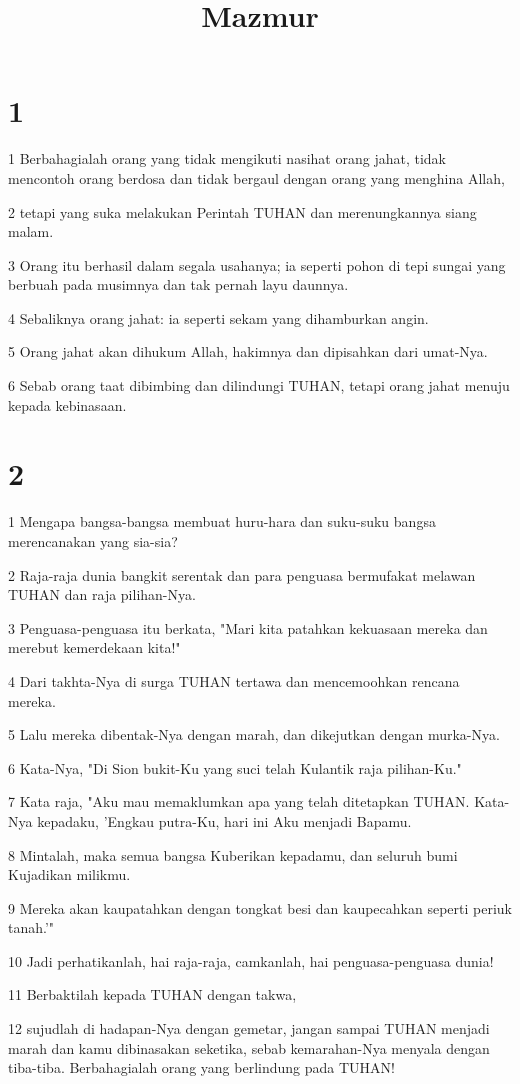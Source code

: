 

\title{Mazmur}


\chapter{1}

\par 1 Berbahagialah orang yang tidak mengikuti nasihat orang jahat, tidak mencontoh orang berdosa dan tidak bergaul dengan orang yang menghina Allah,
\par 2 tetapi yang suka melakukan Perintah TUHAN dan merenungkannya siang malam.
\par 3 Orang itu berhasil dalam segala usahanya; ia seperti pohon di tepi sungai yang berbuah pada musimnya dan tak pernah layu daunnya.
\par 4 Sebaliknya orang jahat: ia seperti sekam yang dihamburkan angin.
\par 5 Orang jahat akan dihukum Allah, hakimnya dan dipisahkan dari umat-Nya.
\par 6 Sebab orang taat dibimbing dan dilindungi TUHAN, tetapi orang jahat menuju kepada kebinasaan.

\chapter{2}

\par 1 Mengapa bangsa-bangsa membuat huru-hara dan suku-suku bangsa merencanakan yang sia-sia?
\par 2 Raja-raja dunia bangkit serentak dan para penguasa bermufakat melawan TUHAN dan raja pilihan-Nya.
\par 3 Penguasa-penguasa itu berkata, "Mari kita patahkan kekuasaan mereka dan merebut kemerdekaan kita!"
\par 4 Dari takhta-Nya di surga TUHAN tertawa dan mencemoohkan rencana mereka.
\par 5 Lalu mereka dibentak-Nya dengan marah, dan dikejutkan dengan murka-Nya.
\par 6 Kata-Nya, "Di Sion bukit-Ku yang suci telah Kulantik raja pilihan-Ku."
\par 7 Kata raja, "Aku mau memaklumkan apa yang telah ditetapkan TUHAN. Kata-Nya kepadaku, 'Engkau putra-Ku, hari ini Aku menjadi Bapamu.
\par 8 Mintalah, maka semua bangsa Kuberikan kepadamu, dan seluruh bumi Kujadikan milikmu.
\par 9 Mereka akan kaupatahkan dengan tongkat besi dan kaupecahkan seperti periuk tanah.'"
\par 10 Jadi perhatikanlah, hai raja-raja, camkanlah, hai penguasa-penguasa dunia!
\par 11 Berbaktilah kepada TUHAN dengan takwa,
\par 12 sujudlah di hadapan-Nya dengan gemetar, jangan sampai TUHAN menjadi marah dan kamu dibinasakan seketika, sebab kemarahan-Nya menyala dengan tiba-tiba. Berbahagialah orang yang berlindung pada TUHAN!

